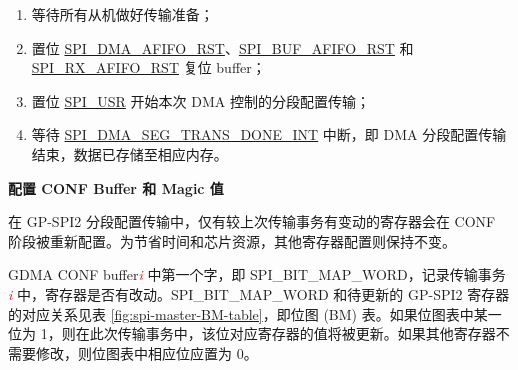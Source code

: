 \documentclass[main\_\_CN.tex]{subfiles}
\begin{document}
\begin{enumerate}
   \item 等待所有从机做好传输准备；
   
    \item 置位 \hyperref[fielddesc:SPIDMAAFIFORST]{SPI\_DMA\_AFIFO\_RST}、\hyperref[fielddesc:SPIBUFAFIFORST]{SPI\_BUF\_AFIFO\_RST} 和 \hyperref[fielddesc:SPIRXAFIFORST]{SPI\_RX\_AFIFO\_RST} 复位 buffer；
   
   \item 置位 \hyperref[fielddesc:SPIUSR]{SPI\_USR} 开始本次 DMA 控制的分段配置传输；
   
   \item 等待 \hyperref[int:SPIDMASEGTRANSDONEINT]{SPI\_DMA\_SEG\_TRANS\_DONE\_INT} 中断，即 DMA 分段配置传输结束，数据已存储至相应内存。
 \end{enumerate}

\textbf{配置 CONF Buffer 和 Magic 值}\label{sec:SCT-CONF-Buffer}

在 GP-SPI2 分段配置传输中，仅有较上次传输事务有变动的寄存器会在 CONF 阶段被重新配置。为节省时间和芯片资源，其他寄存器配置则保持不变。 

GDMA CONF buffer\textcolor{red}{\it i} 中第一个字，即 SPI\_BIT\_MAP\_WORD，记录传输事务 \textcolor{red}{\it i} 中，寄存器是否有改动。SPI\_BIT\_MAP\_WORD 和待更新的 GP-SPI2 寄存器的对应关系见表  \ref{fig:spi-master-BM-table}，即位图 (BM) 表。如果位图表中某一位为 1，则在此次传输事务中，该位对应寄存器的值将被更新。如果其他寄存器不需要修改，则位图表中相应位应置为 0。
\end{document}
